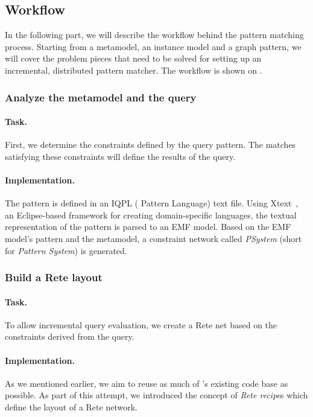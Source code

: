 \subsection{Workflow}
\label{subsec:workflow}

In the following part, we will describe the workflow behind the pattern matching process. Starting from a metamodel, an instance model and a graph pattern, we will cover the problem pieces that need to be solved for setting up an incremental, distributed pattern matcher. The workflow is shown on .


\subsubsection{Analyze the metamodel and the query}

\paragraph{Task.} First, we determine the constraints defined by the query pattern. The matches satisfying these constraints will define the results of the query.

\paragraph{Implementation.} The pattern is defined in an IQPL (\iq{} Pattern Language) text file. Using Xtext~\cite{Xtext}, an Eclipse-based framework for creating domain-specific languages, the textual representation of the pattern is parsed to an EMF model. Based on the EMF model's pattern and the metamodel, a constraint network called \textit{PSystem} (short for \textit{Pattern System}) is generated. 

\subsubsection{Build a Rete layout}

\paragraph{Task.} To allow incremental query evaluation, we create a Rete net based on the constraints derived from the query.

\paragraph{Implementation.} As we mentioned earlier, we aim to reuse as much of \eiq{}'s existing code base as possible. As part of this attempt, we introduced the concept of \textit{Rete recipe}s which define the layout of a Rete network.    

